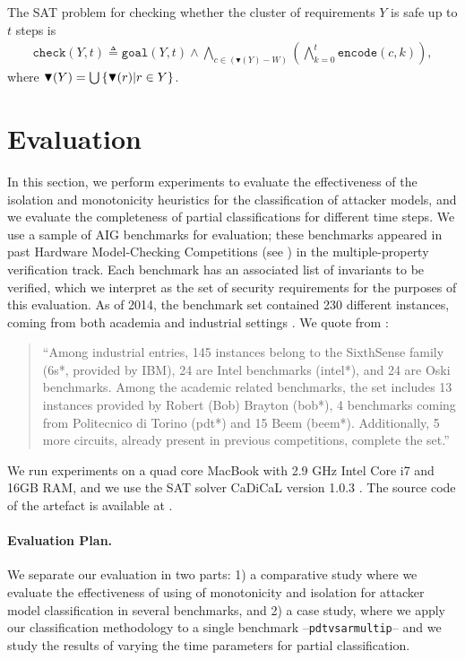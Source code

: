 The SAT problem for checking whether the cluster of requirements $Y$ is safe up to $t$ steps is
\begin{align} 
\label{eq:MasterEq}
\mathtt{check}(Y,t)\triangleq\mathtt{goal}(Y,t)\land\! \bigwedge_{c\in (\blacktriangledown(Y)- W)}\left( \bigwedge_{k=0}^{t}{\mathtt{encode}(c,k)}\right),
\end{align}
where $\blacktriangledown(Y)=\bigcup \left\{\blacktriangledown(r)| r\in Y\right\}$.


\section{Evaluation}
\label{sec:evaluation}
In this section, we perform experiments to evaluate the effectiveness of the isolation and monotonicity heuristics for the classification of attacker models, and we evaluate the completeness of partial classifications for different time steps. We use a sample of AIG benchmarks for evaluation; these benchmarks appeared in past Hardware Model-Checking Competitions (see \cite{HWMCC2011,HWMCC2013}) in the multiple-property verification track. Each benchmark has an associated list of invariants to be verified, which we interpret as the set of security requirements for the purposes of this evaluation. As of 2014, the benchmark set contained 230 different instances, coming from both academia and industrial settings \cite{HWMCC2014BM}. We quote from \cite{HWMCC2014BM}:
\begin{quote}
``Among industrial entries, 145 instances
belong to the SixthSense family (6s*, provided by IBM), 24 are Intel benchmarks (intel*),
and 24 are Oski benchmarks. Among the academic related benchmarks, the set includes 13
instances provided by Robert (Bob) Brayton (bob*), 4 benchmarks coming from Politecnico
di Torino (pdt*) and 15 Beem (beem*). Additionally, 5 more circuits, already present in
previous competitions, complete the set.''
\end{quote}
We run experiments on a quad core MacBook with 2.9 GHz Intel Core i7 and 16GB RAM, and we use the SAT solver CaDiCaL version 1.0.3 \cite{Cadical}. The source code of the artefact is available at \cite{aig-ac-asset}.

\paragraph{Evaluation Plan.} We separate our evaluation in two parts: 1) a comparative study where we evaluate the effectiveness of using of monotonicity and isolation for attacker model classification in several benchmarks, and 2) a case study, where we apply our classification methodology to a single benchmark --\texttt{pdtvsarmultip}-- and we study the results of varying the time parameters for partial classification.

